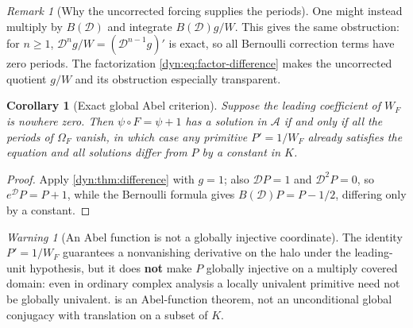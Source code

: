 \documentclass[11pt,letterpaper]{article}
\newtheorem{corollary}[corollary]{Corollary}
\theoremstyle{definition}
\theoremstyle{remark}
\newtheorem{remark}[remark]{Remark}
\newtheorem{warning}[warning]{Warning}
\newcommand{\AAA}{\mathscr A}
\numberwithin{equation}{section}
\begin{document}
\begin{remark}[Why the uncorrected forcing supplies the periods]
\label{dyn:rem:bernoulli}
One might instead multiply by $B(\mathscr D)$ and integrate
$B(\mathscr D)g/W$. This gives the same obstruction: for $n\ge1$,
$\mathscr D^{n}g/W=(\mathscr D^{n-1}g)'$ is exact, so all Bernoulli
correction terms have zero periods. The factorization
\eqref{dyn:eq:factor-difference} makes the uncorrected quotient $g/W$ and
its obstruction especially transparent.
\end{remark}

\begin{corollary}[Exact global Abel criterion]\label{dyn:cor:abel}
Suppose the leading coefficient of $W_F$ is nowhere zero. Then
$\psi\circ F=\psi+1$ has a solution in $\AAA$ if and only if \emph{all} the
periods of $\Omega_F$ vanish, in which case any primitive $P'=1/W_F$
already satisfies the equation and all solutions differ from $P$ by a
constant in $K$.
\end{corollary}
\begin{proof}
Apply \cref{dyn:thm:difference} with $g=1$; also $\mathscr DP=1$ and
$\mathscr D^{2}P=0$, so $e^{\mathscr D}P=P+1$, while the Bernoulli formula
gives $B(\mathscr D)P=P-1/2$, differing only by a constant.
\end{proof}

\begin{warning}[An Abel function is not a globally injective coordinate]
\label{dyn:warn:abel}
The identity $P'=1/W_F$ guarantees a nonvanishing derivative on the halo
under the leading-unit hypothesis, but it does \textbf{not} make $P$
globally injective on a multiply covered domain: even in ordinary complex
analysis a locally univalent primitive need not be globally univalent.
 is an Abel-function theorem, not an unconditional
global conjugacy with translation on a subset of $K$.
\end{warning}
\end{document}
